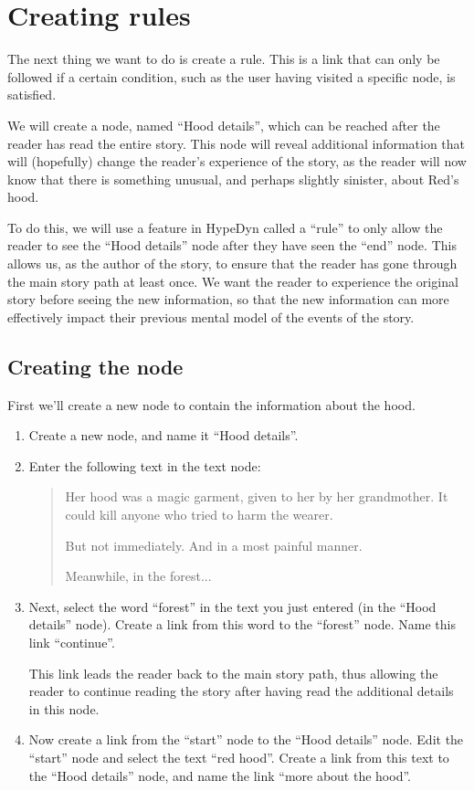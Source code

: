 \documentclass{article}
\begin{document}
\section{Creating rules}

The next thing we want to do is create a rule. This is a link that can only be
followed if a certain condition, such as the user having visited a specific
node, is satisfied.

We will create a node, named ``Hood details'', which can be reached after the
reader has read the entire story. This node will reveal additional information
that will (hopefully) change the reader's experience of the story, as the reader
will now know that there is something unusual, and perhaps slightly sinister,
about Red's hood.

To do this, we will use a feature in HypeDyn called a ``rule'' to only allow the
reader to see the ``Hood details'' node after they have seen the ``end'' node.
This allows us, as the author of the story, to ensure that the reader has gone
through the main story path at least once. We want the reader to experience the
original story before seeing the new information, so that the new information
can more effectively impact their previous mental model of the events of the
story.

\subsection{Creating the node}

First we'll create a new node to contain the information about the hood.

\begin{enumerate}
  \item Create a new node, and name it ``Hood details''.
  \item Enter the following text in the text node:

\begin{quotation}
Her hood was a magic garment, given to her by her grandmother.
It could kill anyone who tried to harm the wearer.

But not immediately. And in a most painful manner.

Meanwhile, in the forest...
\end{quotation}

\item Next, select the word ``forest'' in the text you just entered (in the 
``Hood details'' node). Create a link from this word to the ``forest'' node.
Name this link ``continue''. 

This link leads the reader back to the main story path, thus allowing the
reader to continue reading the story after having read the additional details in
this node.
\item Now create a link from the ``start'' node to the ``Hood details'' node.
Edit the ``start'' node and select the text ``red hood''. Create a link from
this text to the ``Hood details'' node, and name the link ``more about the hood''.
\end{enumerate}
\end{document}

